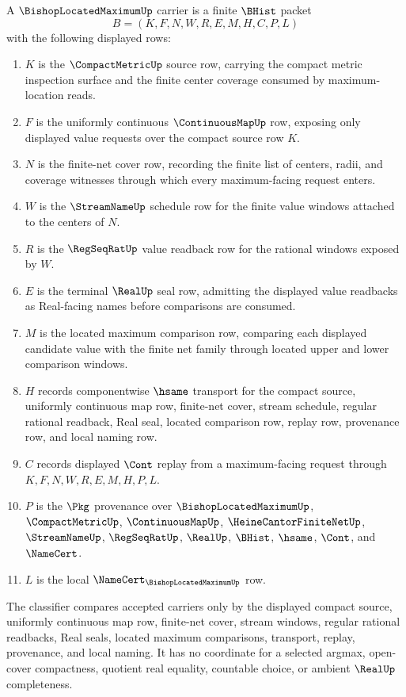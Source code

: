 \begin{definition}
\label{def:bishop-located-maximum-carrier}
A $\BishopLocatedMaximumUp$ carrier is a finite $\BHist$ packet
$$
B=(K,F,N,W,R,E,M,H,C,P,L)
$$
with the following displayed rows:
\begin{enumerate}
\item $K$ is the $\CompactMetricUp$ source row, carrying the compact metric inspection surface and the finite center coverage consumed by maximum-location reads.
\item $F$ is the uniformly continuous $\ContinuousMapUp$ row, exposing only displayed value requests over the compact source row $K$.
\item $N$ is the finite-net cover row, recording the finite list of centers, radii, and coverage witnesses through which every maximum-facing request enters.
\item $W$ is the $\StreamNameUp$ schedule row for the finite value windows attached to the centers of $N$.
\item $R$ is the $\RegSeqRatUp$ value readback row for the rational windows exposed by $W$.
\item $E$ is the terminal $\RealUp$ seal row, admitting the displayed value readbacks as Real-facing names before comparisons are consumed.
\item $M$ is the located maximum comparison row, comparing each displayed candidate value with the finite net family through located upper and lower comparison windows.
\item $H$ records componentwise $\hsame$ transport for the compact source, uniformly continuous map row, finite-net cover, stream schedule, regular rational readback, Real seal, located comparison row, replay row, provenance row, and local naming row.
\item $C$ records displayed $\Cont$ replay from a maximum-facing request through $K,F,N,W,R,E,M,H,P,L$.
\item $P$ is the $\Pkg$ provenance over $\BishopLocatedMaximumUp$, $\CompactMetricUp$, $\ContinuousMapUp$, $\HeineCantorFiniteNetUp$, $\StreamNameUp$, $\RegSeqRatUp$, $\RealUp$, $\BHist$, $\hsame$, $\Cont$, and $\NameCert$.
\item $L$ is the local $\NameCert_{\BishopLocatedMaximumUp}$ row.
\end{enumerate}
The classifier compares accepted carriers only by the displayed compact source, uniformly continuous map row, finite-net cover, stream windows, regular rational readbacks, Real seals, located maximum comparisons, transport, replay, provenance, and local naming. It has no coordinate for a selected argmax, open-cover compactness, quotient real equality, countable choice, or ambient $\RealUp$ completeness.
\end{definition}

